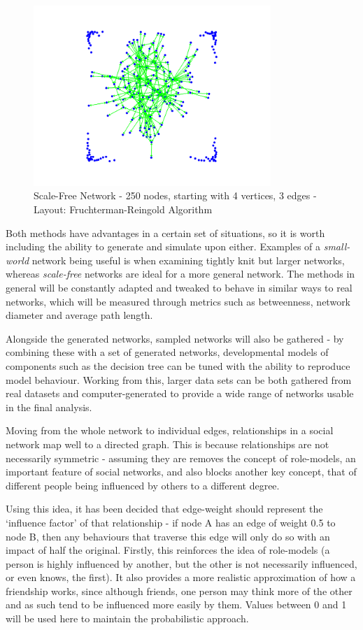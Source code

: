 \documentclass[]{article}
\begin{document}
\begin{figure}
	\centering
		\includegraphics[width=0.80\textwidth]{scale-free2.png}
	\caption{Scale-Free Network - 250 nodes, starting with 4 vertices, 3 edges - Layout: Fruchterman-Reingold Algorithm}
	\label{fig:scale-free2}
\end{figure}

Both methods have advantages in a certain set of situations, so it is worth including the ability to generate and simulate upon either. Examples of a \emph{small-world} network being useful is when examining tightly knit but larger networks, whereas \emph{scale-free} networks are ideal for a more general network. The methods in general will be constantly adapted and tweaked to behave in similar ways to real networks, which will be measured through metrics such as betweenness, network diameter and average path length. 

Alongside the generated networks, sampled networks will also be gathered - by combining these with a set of generated networks, developmental models of components such as the decision tree can be tuned with the ability to reproduce model behaviour. Working from this, larger data sets can be both gathered from real datasets and computer-generated to provide a wide range of networks usable in the final analysis. 

Moving from the whole network to individual edges, relationships in a social network map well to a directed graph. This is because relationships are not necessarily symmetric - assuming they are removes the concept of role-models, an important feature of social networks, and also blocks another key concept,  that of different people being influenced by others to a different degree. 

Using this idea, it has been decided that edge-weight should represent the `influence factor' of that relationship - if node A has an edge of weight 0.5 to node B, then any behaviours that traverse this edge will only do so with an impact of half the original. Firstly, this reinforces the idea of role-models (a person is highly influenced by another, but the other is not necessarily influenced, or even knows, the first). It also provides a more realistic approximation of how a friendship works, since although friends, one person may think more of the other and as such tend to be influenced more easily by them. Values between 0 and 1 will be used here to maintain the probabilistic approach.
\end{document}
